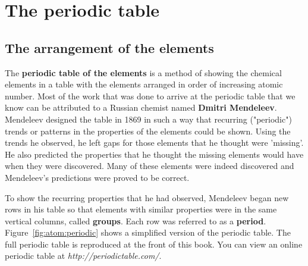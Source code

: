          \chapter{The periodic table}
    \setcounter{figure}{1}
    \setcounter{subfigure}{1}
 \label{m38760*cid9}
            \section{The arrangement of the elements}
            \nopagebreak
      \label{m38760*id261491}The \textbf{periodic table of the elements} is a method of showing the chemical elements in a table with the elements arranged in order of increasing atomic number. Most of the work that was done to arrive at the periodic table that we know can be attributed to a Russian chemist named \textbf{Dmitri Mendeleev}. Mendeleev designed the table in 1869 in such a way that recurring ("periodic") trends or patterns in the properties of the elements could be shown. Using the trends he observed, he left gaps for those elements that he thought were 'missing'. He also predicted the properties that he thought the missing elements would have when they were discovered. Many of these elements were indeed discovered and Mendeleev's predictions were proved to be correct.\par 
{}
      \label{m38760*id261511}To show the recurring properties that he had observed, Mendeleev began new rows in his table so that elements with similar properties were in the same vertical columns, called \textbf{groups}. Each row was referred to as a \textbf{period}. Figure~\ref{fig:atom:periodic} shows a simplified version of the periodic table. The full periodic table is reproduced at the front of this book. You can view an online periodic table at \textsl{http://periodictable.com/}. \par 
    \setcounter{subfigure}{0}

